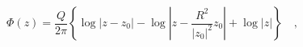 \begin{equation}
\Phi(z)=\frac{Q}{2\pi}\left\{\log\left|z-z_0\right|-\log\left|z-\frac{R^2}{\left|z_0\right|^2}z_0\right|+\log|z|\right\}\quad,
\end{equation}


